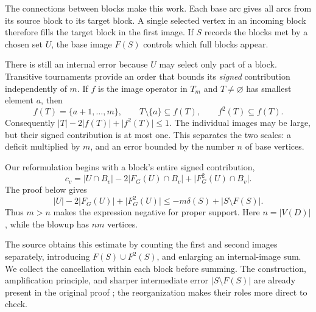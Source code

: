 \documentclass[11pt]{article}
\newcommand{\abs}[1]{\lvert#1\rvert}
\begin{document}
The connections between blocks make this work. Each base arc gives
all arcs from its source block to its target block. A single selected
vertex in an incoming block therefore fills the target block in the
first image. If $S$ records the blocks met by a chosen set $U$, the
base image $F(S)$ controls which full blocks appear.

There is still an internal error because $U$ may select only part of
a block. Transitive tournaments provide an order that bounds its
\emph{signed} contribution independently of $m$. If $f$ is the image
operator in $T_m$ and $T\ne\varnothing$ has smallest element $a$, then
\begin{equation}
 f(T)=\{a+1,\ldots,m\},\qquad
 T\setminus\{a\}\subseteq f(T),\qquad f^2(T)\subseteq f(T).
 \label{eq:tail-properties}
\end{equation}
Consequently $\abs T-2\abs{f(T)}+\abs{f^2(T)}\le1$.
The individual images may be large, but their signed contribution is
at most one. This separates the two scales: a deficit multiplied by
$m$, and an error bounded by the number $n$ of base vertices.

Our reformulation begins with a block's entire signed contribution,
\[
 c_v=\abs{U\cap B_v}-2\abs{F_G(U)\cap B_v}
                         +\abs{F_G^2(U)\cap B_v}.
\]
The proof below gives
\begin{equation}
 \abs U-2\abs{F_G(U)}+\abs{F_G^2(U)}
       \le -m\delta(S)+\abs{S\setminus F(S)}.
 \label{eq:budget}
\end{equation}
Thus $m>n$ makes the expression negative for proper support. Here
$n=\abs{V(D)}$, while the blowup has $nm$ vertices.

The source obtains this estimate by counting the first and second
images separately, introducing $F(S)\cup F^2(S)$, and enlarging an
internal-image sum. We collect the cancellation within each block
before summing. The construction, amplification principle, and sharper
intermediate error $\abs{S\setminus F(S)}$ are already present in
the original proof \cite[Lemma 2.3]{openai}; the reorganization makes
their roles more direct to check.
\end{document}

